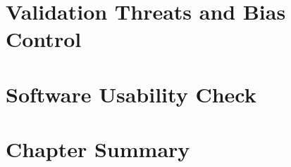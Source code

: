 \section{Validation Threats and Bias Control}
\label{sec:validation-threats}


\section{Software Usability Check}
\label{sec:usability-check}


\section{Chapter Summary}
\label{sec:validation-method-summary}

